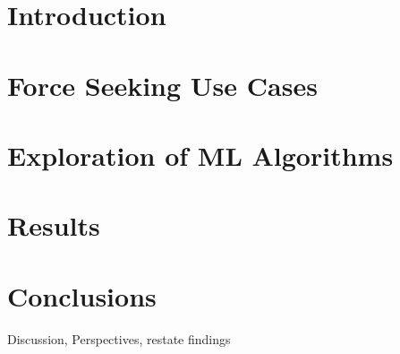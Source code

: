 \documentclass[english]{spimubphdthesis}
\begin{document}
\section{Introduction}
\section{Force Seeking Use Cases}
\section{Exploration of ML Algorithms}
\section{Results}
\section{Conclusions}
Discussion, Perspectives, restate findings
\end{document}
